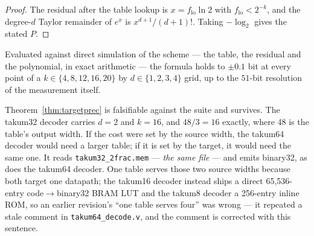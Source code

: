 \documentclass[11pt]{article}
\theoremstyle{definition}
\begin{document}
\begin{proof}
The residual after the table lookup is $x = f_{\mathrm{lo}}\ln 2$ with
$f_{\mathrm{lo}} < 2^{-k}$, and the degree-$d$ Taylor remainder of $e^{x}$ is
$x^{d+1}/(d+1)!$. Taking $-\log_2$ gives the stated $P$.
\end{proof}

Evaluated against direct simulation of the scheme --- the table, the residual and
the polynomial, in exact arithmetic --- the formula holds to $\pm 0.1$ bit at every
point of a $k \in \{4,8,12,16,20\}$ by $d \in \{1,2,3,4\}$ grid, up to the
$51$-bit resolution of the measurement itself.

Theorem~\ref{thm:targetprec} is falsifiable against the suite and survives. The
takum32 decoder carries $d = 2$ and $k = 16$, and $48/3 = 16$ exactly, where 48 is
the table's output width. If the cost were set by the source width, the takum64
decoder would need a larger table; if it is set by the target, it would need the
same one. It reads \texttt{takum32\_2frac.mem} --- \emph{the same file} --- and
emits binary32, as does the takum64 decoder. One table serves those two source
widths because both target one datapath; the takum16 decoder instead ships a
direct 65,536-entry code$\to$binary32 BRAM LUT and the takum8 decoder a
256-entry inline ROM, so an earlier revision's ``one table serves four'' was
wrong --- it repeated a stale comment in \texttt{takum64\_decode.v}, and the
comment is corrected with this sentence.
\end{document}
